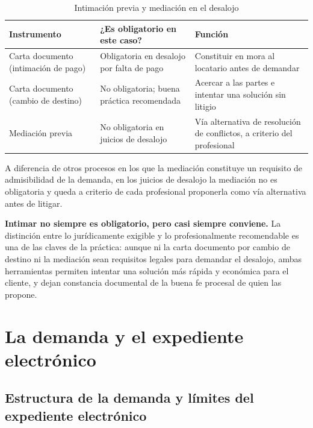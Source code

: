 \documentclass[12pt,oneside]{book}
\begin{document}
\begin{table}[H]
\centering
\caption{Intimación previa y mediación en el desalojo}
\begin{tabularx}{\textwidth}{>{\raggedright\arraybackslash}p{} >{\raggedright\arraybackslash}p{} X}
\toprule
\textbf{Instrumento} & \textbf{¿Es obligatorio en este caso?} & \textbf{Función} \\
\midrule
Carta documento (intimación de pago) & Obligatoria en desalojo por falta de pago & Constituir en mora al locatario antes de demandar \\
Carta documento (cambio de destino) & No obligatoria; buena práctica recomendada & Acercar a las partes e intentar una solución sin litigio \\
Mediación previa & No obligatoria en juicios de desalojo & Vía alternativa de resolución de conflictos, a criterio del profesional \\
\bottomrule
\end{tabularx}
\end{table}

A diferencia de otros procesos en los que la mediación constituye un requisito de admisibilidad de la demanda, en los juicios de desalojo la mediación no es obligatoria y queda a criterio de cada profesional proponerla como vía alternativa antes de litigar.

\begin{important}
\textbf{Intimar no siempre es obligatorio, pero casi siempre conviene.} La distinción entre lo jurídicamente exigible y lo profesionalmente recomendable es una de las claves de la práctica: aunque ni la carta documento por cambio de destino ni la mediación sean requisitos legales para demandar el desalojo, ambas herramientas permiten intentar una solución más rápida y económica para el cliente, y dejan constancia documental de la buena fe procesal de quien las propone.
\end{important}

\chapter{La demanda y el expediente electrónico}

\section{Estructura de la demanda y límites del expediente electrónico}
\end{document}

